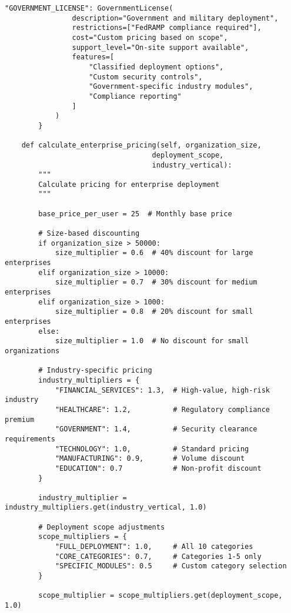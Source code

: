 \documentclass[10pt,twocolumn]{IEEEtran}
\begin{document}
\begin{lstlisting}[caption={CPF Licensing Framework}]
            "GOVERNMENT_LICENSE": GovernmentLicense(
                description="Government and military deployment",
                restrictions=["FedRAMP compliance required"],
                cost="Custom pricing based on scope",
                support_level="On-site support available",
                features=[
                    "Classified deployment options",
                    "Custom security controls",
                    "Government-specific industry modules",
                    "Compliance reporting"
                ]
            )
        }
    
    def calculate_enterprise_pricing(self, organization_size, 
                                   deployment_scope, 
                                   industry_vertical):
        """
        Calculate pricing for enterprise deployment
        """
        
        base_price_per_user = 25  # Monthly base price
        
        # Size-based discounting
        if organization_size > 50000:
            size_multiplier = 0.6  # 40% discount for large enterprises
        elif organization_size > 10000:
            size_multiplier = 0.7  # 30% discount for medium enterprises
        elif organization_size > 1000:
            size_multiplier = 0.8  # 20% discount for small enterprises
        else:
            size_multiplier = 1.0  # No discount for small organizations
        
        # Industry-specific pricing
        industry_multipliers = {
            "FINANCIAL_SERVICES": 1.3,  # High-value, high-risk industry
            "HEALTHCARE": 1.2,          # Regulatory compliance premium
            "GOVERNMENT": 1.4,          # Security clearance requirements
            "TECHNOLOGY": 1.0,          # Standard pricing
            "MANUFACTURING": 0.9,       # Volume discount
            "EDUCATION": 0.7            # Non-profit discount
        }
        
        industry_multiplier = industry_multipliers.get(industry_vertical, 1.0)
        
        # Deployment scope adjustments
        scope_multipliers = {
            "FULL_DEPLOYMENT": 1.0,     # All 10 categories
            "CORE_CATEGORIES": 0.7,     # Categories 1-5 only
            "SPECIFIC_MODULES": 0.5     # Custom category selection
        }
        
        scope_multiplier = scope_multipliers.get(deployment_scope, 1.0)
        

\end{lstlisting}
\end{document}

